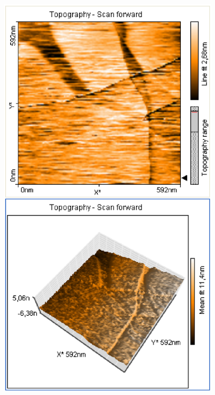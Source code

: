 \documentclass[12pt]{article}
\begin{document}
\begin{figure}[H]  
\begin{minipage}{0.4\linewidth}
\centering
\includegraphics[width=0.9\linewidth]{../plot/data/graphit/graphit.eps}
\end{minipage}
\begin{minipage}{0.2\linewidth}
\centering
\end{minipage}
\begin{minipage}{0.4\linewidth}
\centering

\end{minipage}
\end{figure}
\end{document}
